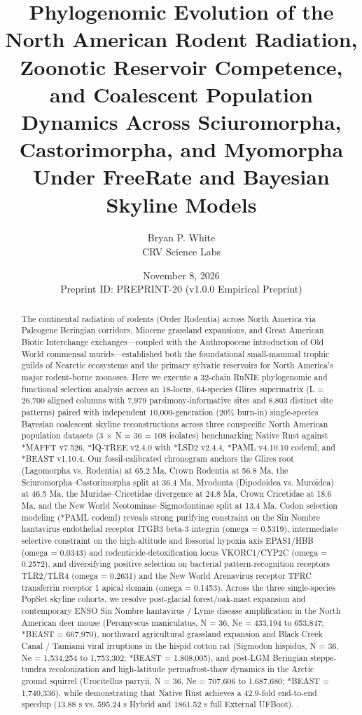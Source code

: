 \documentclass[10pt,letterpaper]{article}
\title{\textbf{Phylogenomic Evolution of the North American Rodent Radiation, Zoonotic Reservoir Competence, and Coalescent Population Dynamics Across Sciuromorpha, Castorimorpha, and Myomorpha Under FreeRate and Bayesian Skyline Models}}
\author{Bryan P. White \\ CRV Science Labs}
\date{November 8, 2026 \\ \small Preprint ID: PREPRINT-20 (v1.0.0 Empirical Preprint)}
\begin{document}
\maketitle

\begin{abstract}
The continental radiation of rodents (Order Rodentia) across North America via Paleogene Beringian corridors, Miocene grassland expansions, and Great American Biotic Interchange exchanges—coupled with the Anthropocene introduction of Old World commensal murids—established both the foundational small-mammal trophic guilds of Nearctic ecosystems and the primary sylvatic reservoirs for North America's major rodent-borne zoonoses. Here we execute a 32-chain RuNIE phylogenomic and functional selection analysis across an 18-locus, 64-species Glires supermatrix (L = 26,700 aligned columns with 7,979 parsimony-informative sites and 8,803 distinct site patterns) paired with independent 10,000-generation (20\% burn-in) single-species Bayesian coalescent skyline reconstructions across three conspecific North American population datasets (3 × N = 36 = 108 isolates) benchmarking Native Rust against *MAFFT v7.526, *IQ-TREE v2.4.0 with *LSD2 v2.4.4, *PAML v4.10.10 codeml, and *BEAST v1.10.4. Our fossil-calibrated chronogram anchors the Glires root (Lagomorpha vs. Rodentia) at 65.2 Ma, Crown Rodentia at 56.8 Ma, the Sciuromorpha–Castorimorpha split at 36.4 Ma, Myodonta (Dipodoidea vs. Muroidea) at 46.5 Ma, the Muridae–Cricetidae divergence at 24.8 Ma, Crown Cricetidae at 18.6 Ma, and the New World Neotominae–Sigmodontinae split at 13.4 Ma. Codon selection modeling (*PAML codeml) reveals strong purifying constraint on the Sin Nombre hantavirus endothelial receptor ITGB3 beta-3 integrin (omega = 0.5319), intermediate selective constraint on the high-altitude and fossorial hypoxia axis EPAS1/HBB (omega = 0.0343) and rodenticide-detoxification locus VKORC1/CYP2C (omega = 0.2572), and diversifying positive selection on bacterial pattern-recognition receptors TLR2/TLR4 (omega = 0.2631) and the New World Arenavirus receptor TFRC transferrin receptor 1 apical domain (omega = 0.1453). Across the three single-species PopSet skyline cohorts, we resolve post-glacial forest/oak-mast expansion and contemporary ENSO Sin Nombre hantavirus / Lyme disease amplification in the North American deer mouse (Peromyscus maniculatus, N = 36, Ne = 433,194 to 653,847; *BEAST = 667,970), northward agricultural grassland expansion and Black Creek Canal / Tamiami viral irruptions in the hispid cotton rat (Sigmodon hispidus, N = 36, Ne = 1,534,254 to 1,753,302; *BEAST = 1,808,005), and post-LGM Beringian steppe-tundra recolonization and high-latitude permafrost-thaw dynamics in the Arctic ground squirrel (Urocitellus parryii, N = 36, Ne = 707,606 to 1,687,680; *BEAST = 1,740,336), while demonstrating that Native Rust achieves a 42.9-fold end-to-end speedup (13.88 s vs. 595.24 s Hybrid and 1861.52 s full External UFBoot). \cite{White2026RuNIE,Fabre2012,Steppan2017,Leite2014,Hjelle2010,Gavrilovskaya1998,Abraham2009,Demogines2013,Pelz2005,Storz2009,Tschirren2013,Gage2005,Ostfeld2006,Suchard2018,Katoh2013,Minh2020,To2016,Yang2007}.
\end{abstract}
\end{document}
